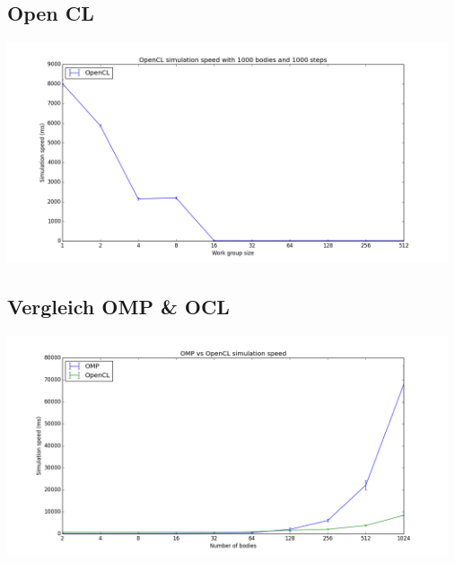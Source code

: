 \documentclass{beamer}
\begin{document}
\subsection{Open CL}
\begin{frame}
\includegraphics[width=13cm]{img/ocl_1000b_1000s_10r.png}
\end{frame}

\subsection{Vergleich OMP \& OCL}
\begin{frame}
\includegraphics[width=13cm]{img/omp_and_ocl.png}
\end{frame}
\end{document}
